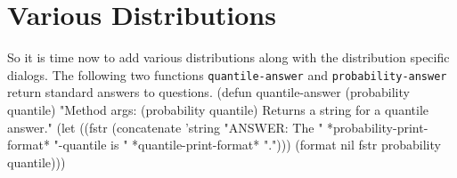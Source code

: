 \section{Various Distributions}
\label{sec:variousdists}
So it is time now to add various distributions along with the
distribution specific dialogs. The following two functions
{\tt{}quantile-answer} and {\tt{}probability-answer} return standard
answers to questions.
\nwenddocs{}\plusendmoddef
(defun quantile-answer (probability quantile)
"Method args: (probability quantile)
Returns a string for a quantile answer."
  (let ((fstr (concatenate 'string
               "ANSWER: The " *probability-print-format* "-quantile is "
               *quantile-print-format* ".")))
     (format nil fstr probability quantile)))
\eatline
{}\nwendcode{}\nwdocspar


